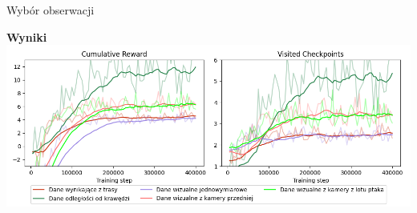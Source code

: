\begin{frame}{Wybór obserwacji}
	
	\textbf{Wyniki}
	\includegraphics[width=\linewidth]{figures/input_observations.png}
	
\end{frame}
